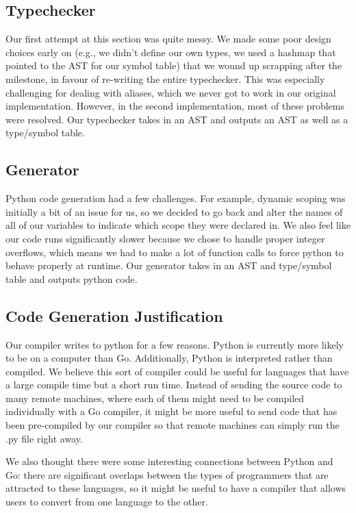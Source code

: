 \documentclass{article}
\begin{document}
\subsection{Typechecker}

Our first attempt at this section was quite messy. We made some poor design choices early on (e.g., we didn't define our own types, we used a hashmap that pointed to the AST for our symbol table) that we wound up scrapping after the milestone, in favour of re-writing the entire typechecker. This was especially challenging for dealing with aliases, which we never got to work in our original implementation. However, in the second implementation, most of these problems were resolved. Our typechecker takes in an AST and outputs an AST as well as a type/symbol table.

\subsection{Generator}

Python code generation had a few challenges. For example, dynamic scoping was initially a bit of an issue for us, so we decided to go back and alter the names of all of our variables to indicate which scope they were declared in. We also feel like our code runs significantly slower because we chose to handle proper integer overflows, which means we had to make a lot of function calls to force python to behave properly at runtime. Our generator takes in an AST and type/symbol table and outputs python code.

\subsection{Code Generation Justification}
Our compiler writes to python for a few reasons. Python is currently more likely to be on a computer than Go. Additionally, Python is interpreted rather than compiled. We believe this sort of compiler could be useful for languages that have a large compile time but a short run time. Instead of sending the source code to many remote machines, where each of them might need to be compiled individually with a Go compiler, it might be more useful to send code that has been pre-compiled by our compiler so that remote machines can simply run the .py file right away.

We also thought there were some interesting connections between Python and Go: there are significant overlaps between the types of programmers that are attracted to these languages, so it might be useful to have a compiler that allows users to convert from one language to the other. 
\end{document}
